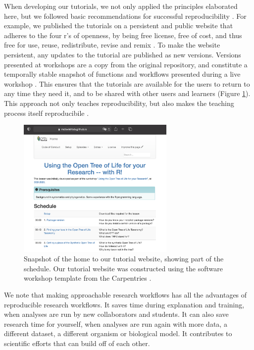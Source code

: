 \documentclass[12pt]{article}
\begin{document}
When developing our tutorials, we not only applied the principles elaborated here,
but we followed basic recommendations for successful reproducibility \citep{sandve2013ten}.
For example, we published the tutorials on a persistent and public website \citep{RopentreeTutorials} that adheres to the four r's of openness, by being free license, free of cost, and thus free for use, reuse, redistribute, revise and remix \citep{hilton2010four}.
To make the website persistent, any updates to the tutorial are published as new versions.
Versions presented at workshops are a copy from the original repository, and constitute a temporally stable snapshot of functions and workflows presented during a live workshop \citep{wilson2006swc, SWCwebsite}.
This ensures that the tutorials are available for the users to return to any time they need it, and to be shared with other users and learners (Figure \ref{fig:schedule}).
This approach not only teaches reproducibility, but also makes the teaching process itself reproducibile \citep{dogucu_tools_2022}.

\begin{figure}
\begin{center}
\includegraphics[width=3in]{fig_schedule.png}
\end{center}
\caption{Snapshot of the home to our tutorial website, showing part of the schedule.
 Our tutorial website was constructed using the software workshop template from the Carpentries \citep{swc-workshop-template}. \label{fig:schedule}}
\end{figure}

We note that making approachable research workflows has all the advantages of reproducible research workflows.
It saves time during explanation and training, when analyses are run by new collaborators and students.
It can also save research time for yourself, when analyses are run again with more data, a different dataset, a different organism or biological model.
It contributes to scientific efforts that can build off of each other.
\end{document}
